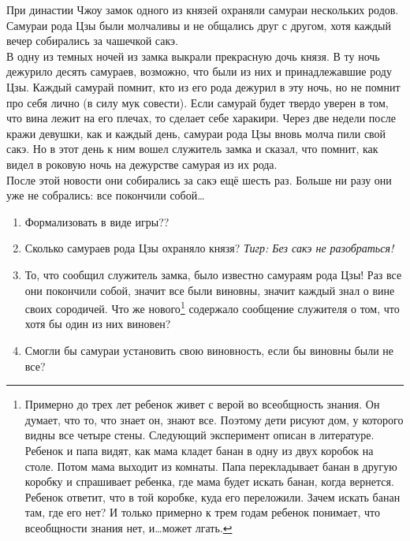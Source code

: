 \begin{problem}
При династии Чжоу замок одного из князей охраняли самураи нескольких родов. Самураи рода Цзы были молчаливы и не общались друг с другом, хотя каждый вечер собирались за чашечкой сакэ.\\
В одну из темных ночей из замка выкрали прекрасную дочь князя. В ту ночь дежурило десять самураев, возможно, что были из них и принадлежавшие роду Цзы. Каждый самурай помнит, кто из его рода дежурил в эту ночь, но не помнит про себя лично (в силу мук совести). Если самурай будет твердо уверен в том, что вина лежит на его плечах, то сделает себе харакири.
Через две недели после кражи девушки, как и каждый день, самураи рода Цзы вновь молча пили свой сакэ. Но в этот день к ним вошел служитель замка и сказал, что помнит, как видел в роковую ночь на дежурстве самурая из их рода.\\
После этой новости они собирались за сакэ ещё шесть раз. Больше ни разу они уже не собрались: все покончили собой\ldots \\
\begin{enumerate}
\item {\red Формализовать в виде игры??}
\item Сколько самураев рода Цзы охраняло князя? {\it Тигр: Без сакэ не разобраться!}
\item То, что сообщил служитель замка, было известно  самураям рода Цзы! Раз все они покончили собой, значит все были виновны, значит каждый знал о вине своих сородичей. Что же нового\footnote{ Примерно до трех лет ребенок живет с верой во всеобщность знания. Он думает, что то, что знает он, знают все. Поэтому дети рисуют дом, у которого видны все четыре стены. Следующий эксперимент описан в литературе. Ребенок и папа видят, как мама кладет банан в одну из двух коробок на столе. Потом мама выходит из комнаты. Папа перекладывает банан в другую коробку и спрашивает ребенка, где мама будет искать банан, когда вернется. Ребенок ответит, что в той коробке, куда его переложили. Зачем искать банан там, где его нет? И только примерно к трем годам ребенок понимает, что всеобщности знания нет, и\ldots может лгать.} содержало сообщение служителя о том, что хотя бы один из них виновен? 
\item  Смогли бы самураи установить свою виновность, если бы виновны были не все?
\end{enumerate}


\begin{sol}

\end{sol}
\end{problem}




